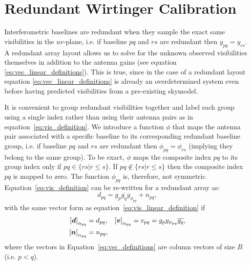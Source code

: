 \documentclass[useAMS,usenatbib]{mn2e}
\newcommand{\bd}{\bmath{d}}
\newcommand{\bv}{\bmath{v}}
\newcommand{\bn}{\bmath{n}}
\newcommand{\conj}[1]{\overline{#1}}
\begin{document}
\section{Redundant Wirtinger Calibration}
\label{sec:red_wirtinger}
Interferometric baselines are redundant when they sample the exact same visibilities in the $uv$-plane, i.e. if baseline $pq$ and $rs$ are redundant then $y_{pq} = y_{rs}$. 
A redundant array layout allows us to solve for the unknown observed visibilities themselves in
addition to the antenna gains (see equation \ref{eq:vec_linear_definitions}). This is true, since in the case of a redundant layout equation \ref{eq:vec_linear_definitions} is already an overdetermined 
system even before having predicted visibilities from a pre-existing skymodel. 


It is convenient to group redundant visibilities together and label each group using a single index rather than using their antenna pairs as in equation~\ref{eq:vis_definition}. We introduce a function $\phi$ that maps the antenna pair associated with a specific baseline to its corresponding redundant baseline group, i.e. if baseline $pq$ and $rs$ are redundant then $\phi_{pq} = \phi_{rs}$ (implying they belong to the same group). 
To be exact, $\phi$ maps the composite index $pq$ to its group index only if $pq\in\{rs|r\leq s\}$. If $pq\notin\{rs|r\leq s\}$ then the 
composite index $pq$ is mapped to zero. The function $\phi_{pq}$ is, therefore, not symmetric. Equation~\ref{eq:vis_definition} can be re-written for a redundant array as:
\begin{equation}
\label{eq:vis_red}
d_{pq} = g_{p}\conj{g_q}y_{\phi_{pq}} + n_{pq},
\end{equation}
with the same vector form as equation~\ref{eq:vis_linear_definition} if
\begin{align}
 \left [ \bd \right]_{\alpha_{pq}} &= d_{pq}, & \left [ \bv \right ]_{\alpha_{pq}} &= v_{pq}=g_p y_{\phi_{pq}} \conj{g_q},\nonumber\\
 \left [ \bn \right ]_{\alpha_{pq}} &= n_{pq}, &  &\label{eq:vec_definitions}
\end{align}
where the vectors in Equation~\ref{eq:vec_definitions} are column vectors of size $B$ (i.e. $p<q$).
\end{document}
